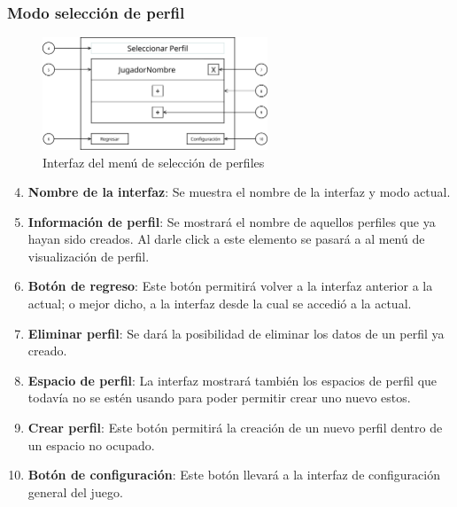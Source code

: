 \subsubsection{Modo selección de perfil}
\begin{figure}[H]
    \centering
    \includegraphics[width=0.6\textwidth]{5-Cuerpo/Chapter5/5.5/I2.png} %
    \caption{Interfaz del menú de selección de perfiles}
    \label{fig:Interface_Seleccion_Perfil}
\end{figure}
\begin{enumerate}\setcounter{enumi}{3}
    \item \textbf{Nombre de la interfaz}: Se muestra el nombre de la interfaz y
    modo actual.
    \item \textbf{Información de perfil}: Se mostrará el nombre de aquellos
    perfiles que ya hayan sido creados. Al darle click a este elemento se pasará
    a al menú de visualización de perfil.
    \item \textbf{Botón de regreso}: Este botón permitirá volver a la interfaz
    anterior a la actual; o mejor dicho, a la interfaz desde la cual se accedió
    a la actual.
    \item \textbf{Eliminar perfil}: Se dará la posibilidad de eliminar los datos
    de un perfil ya creado.
    \item \textbf{Espacio de perfil}: La interfaz mostrará también los espacios
    de perfil que todavía no se estén usando para poder permitir crear uno nuevo
    estos.
    \item \textbf{Crear perfil}: Este botón permitirá la creación de un nuevo
    perfil dentro de un espacio no ocupado.
    \item \textbf{Botón de configuración}: Este botón llevará a la interfaz de
    configuración general del juego.
\end{enumerate}

